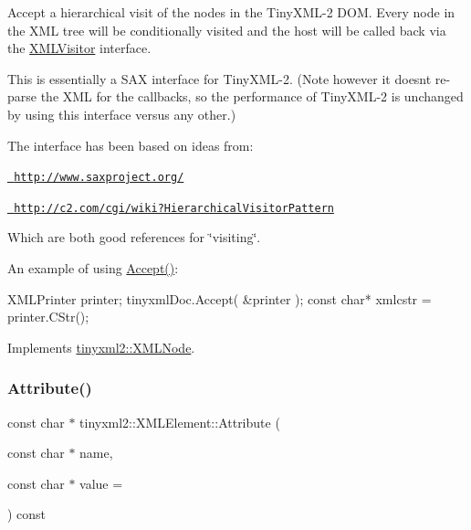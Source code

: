 Accept a hierarchical visit of the nodes in the Tiny\+X\+M\+L-\/2 D\+OM. Every node in the X\+ML tree will be conditionally visited and the host will be called back via the \mbox{\hyperlink{classtinyxml2_1_1_x_m_l_visitor}{X\+M\+L\+Visitor}} interface.

This is essentially a S\+AX interface for Tiny\+X\+M\+L-\/2. (Note however it doesn\textquotesingle{}t re-\/parse the X\+ML for the callbacks, so the performance of Tiny\+X\+M\+L-\/2 is unchanged by using this interface versus any other.)

The interface has been based on ideas from\+:


\begin{DoxyItemize}
\item \href{http://www.saxproject.org/}{\texttt{ http\+://www.\+saxproject.\+org/}}
\item \href{http://c2.com/cgi/wiki?HierarchicalVisitorPattern}{\texttt{ http\+://c2.\+com/cgi/wiki?\+Hierarchical\+Visitor\+Pattern}}
\end{DoxyItemize}

Which are both good references for \char`\"{}visiting\char`\"{}.

An example of using \mbox{\hyperlink{classtinyxml2_1_1_x_m_l_element_a9b2119831e8b85827d5d3e5076788e4a}{Accept()}}\+: \begin{DoxyVerb}XMLPrinter printer;
tinyxmlDoc.Accept( &printer );
const char* xmlcstr = printer.CStr();
\end{DoxyVerb}
 

Implements \mbox{\hyperlink{classtinyxml2_1_1_x_m_l_node_a81e66df0a44c67a7af17f3b77a152785}{tinyxml2\+::\+X\+M\+L\+Node}}.

\mbox{\label{classtinyxml2_1_1_x_m_l_element_a48cf4a315cfbac7d74cd0d5ff2c5df51}} 
\subsubsection{\texorpdfstring{Attribute()}{Attribute()}}
{\footnotesize\ttfamily const char $\ast$ tinyxml2\+::\+X\+M\+L\+Element\+::\+Attribute (\begin{DoxyParamCaption}\item[{const char $\ast$}]{name,  }\item[{const char $\ast$}]{value = {} }\end{DoxyParamCaption}) const}

